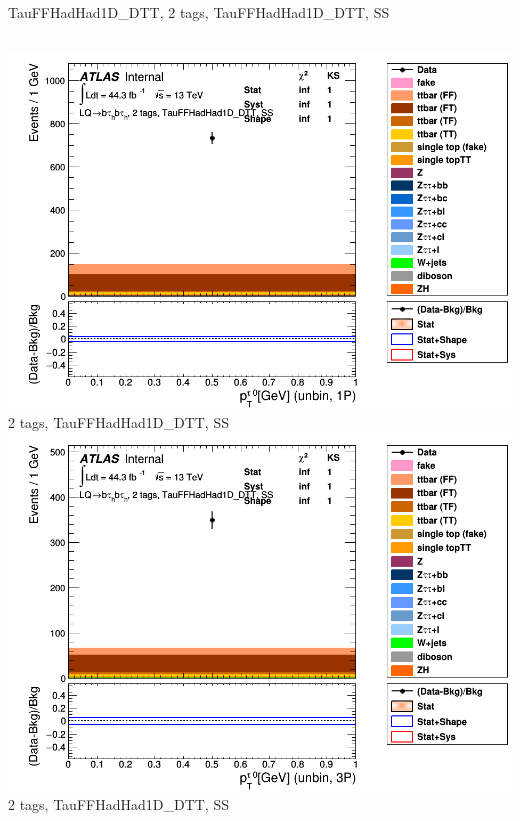 \begin{frame}{TauFFHadHad1D\_DTT, 2 tags, TauFFHadHad1D\_DTT, SS}
\begin{columns}[c]
    \centering\includegraphics[width=\textwidth]{C_2tag2pjet_0ptv_SS_UnbinLeadTau1P}\\
    2 tags, TauFFHadHad1D\_DTT, SS
    \centering\includegraphics[width=\textwidth]{C_2tag2pjet_0ptv_SS_UnbinLeadTau3P}\\
    2 tags, TauFFHadHad1D\_DTT, SS
  \end{columns}
\end{frame}

